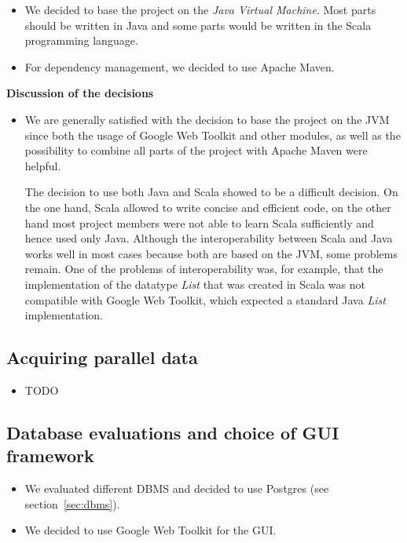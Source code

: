 \begin{itemize}
	\item We decided to base the project on the \emph{Java Virtual Machine}. Most parts should be written in Java and some parts would be written in the Scala programming language.
	\item For dependency management, we decided to use Apache Maven.
\end{itemize}

\noindent\textbf{Discussion of the decisions}

\begin{itemize}
	\item We are generally satisfied with the decision to base the project on the JVM since both the usage of Google Web Toolkit and other modules, as well as the possibility to combine all parts of the project with Apache Maven were helpful. 
	
	The decision to use both Java and Scala showed to be a difficult decision. On the one hand, Scala allowed to write concise and efficient code, on the other hand most project members were not able to learn Scala sufficiently and hence used only Java. Although the interoperability between Scala and Java works well in most cases because both are based on the JVM, some problems remain. One of the problems of interoperability was, for example, that the implementation of the datatype \emph{List} that was created in Scala was not compatible with Google Web Toolkit, which expected a standard Java \emph{List} implementation.
\end{itemize}


\subsection{Acquiring parallel data}

\begin{itemize}
	\item TODO
\end{itemize}


\subsection{Database evaluations and choice of GUI framework}

\begin{itemize}
	\item We evaluated different DBMS and decided to use Postgres (see section~\ref{sec:dbms}).
	\item We decided to use Google Web Toolkit for the GUI.

\end{itemize}


